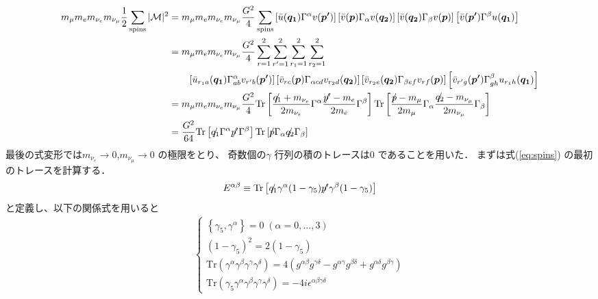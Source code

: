 \begin{align}
m_{\mu}m_{e}m_{\nu_{e}}m_{\nu_{\mu}}\frac{1}{2}\sum_\mathrm{spins}|\mathcal{M}|^{2}
&=m_{\mu}m_{e}m_{\nu_{e}}m_{\nu_{\mu}}\frac{G^{2}}{4}\sum_\mathrm{spins}\left[\Bar{u}(\bm{q_{1}})\Gamma^{\alpha}v(\bm{p'})\right]\left[\Bar{v}(\bm{p})\Gamma_{\alpha}v(\bm{q_{2}})\right]
\left[\Bar{v}(\bm{q_{2}})\Gamma_{\beta}v(\bm{p})\right]\left[\Bar{v}(\bm{p'})\Gamma^{\beta}u(\bm{q_{1}})\right]\notag\\
&=m_{\mu}m_{e}m_{\nu_{e}}m_{\nu_{\mu}}\frac{G^{2}}{4}\sum_{r=1}^2\sum_{r'=1}^2\sum_{r_1=1}^2\sum_{r_2=1}^2\notag\\
&\qquad\left[\Bar{u}_{r_{1}a}(\bm{q_{1}})\Gamma_{ab}^{\alpha}v_{r'b}(\bm{p'})\right]\left[\Bar{v}_{rc}(\bm{p})\Gamma_{\alpha cd}v_{r_{2}d}(\bm{q_{2}})\right]
\left[\Bar{v}_{r_{2}e}(\bm{q_{2}})\Gamma_{\beta ef}v_{rf}(\bm{p})\right]\left[\Bar{v}_{r'g}(\bm{p'})\Gamma_{gh}^{\beta}u_{r_{1}h}(\bm{q_{1}})\right]\notag\\
&=m_{\mu}m_{e}m_{\nu_{e}}m_{\nu_{\mu}}\frac{G^{2}}{4}\mathrm{Tr}\left[\frac{\Slash{q_{1}}+m_{\nu_{e}}}{2m_{\nu_{e}}}\Gamma^{\alpha}\frac{\Slash{p'}-m_{e}}{2m_{e}}\Gamma^{\beta}\right]
\mathrm{Tr}\left[\frac{\Slash{p}-m_{\mu}}{2m_{\mu}}\Gamma_{\alpha}\frac{\Slash{q_{2}}-m_{\nu_{\mu}}}{2m_{\nu_{\mu}}}\Gamma_{\beta}\right]\notag\\
&=\frac{G^{2}}{64}\mathrm{Tr}\left[\Slash{q_{1}}\Gamma^{\alpha}\Slash{p'}\Gamma^{\beta}\right]\mathrm{Tr}\left[\Slash{p}\Gamma_{\alpha}\Slash{q_{2}}\Gamma_{\beta}\right]\label{eq:spins}
\end{align}
%
最後の式変形では$m_{\nu_{e}}\rightarrow 0$,$m_{\nu_{\mu}}\rightarrow 0$ の極限をとり、
奇数個の$\gamma$ 行列の積のトレースは0 であることを用いた．
まずは式(\ref{eq:spins}) の最初のトレースを計算する．
%
\begin{align}
E^{\alpha\beta}\equiv \mathrm{Tr}\left[\Slash{q_{1}}\gamma^{\alpha}(1 - \gamma_{5})\Slash{p'}\gamma^{\beta}(1 - \gamma_{5})\right]
\end{align}
%
と定義し、以下の関係式を用いると
%
\begin{align*}
  \left\{
    \begin{array}{l}
      \left\{\gamma_{5},\gamma^{\alpha}\right\}=0\;(\alpha=0,\dots,3) \\
      (1-\gamma_{5})^{2}=2(1-\gamma_{5}) \\
      \mathrm{Tr}(\gamma^{\alpha}\gamma^{\beta}\gamma^{\gamma}\gamma^{\delta})=4(g^{\alpha\beta}g^{\gamma\delta}-g^{\alpha\gamma}g^{\beta\delta}+g^{\alpha\delta}g^{\beta\gamma}) \\
      \mathrm{Tr}(\gamma_{5}\gamma^{\alpha}\gamma^{\beta}\gamma^{\gamma}\gamma^{\delta})=-4i\epsilon^{\alpha\beta\gamma\delta}
    \end{array}
  \right.
\end{align*}

